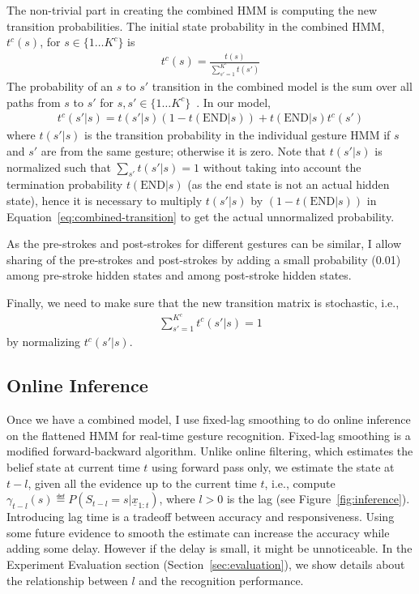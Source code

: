 The non-trivial part in creating the combined HMM is computing the new 
transition probabilities. The initial state probability in the combined
HMM, $t^c(s)$, for $s\in\{1\ldots K^c\}$ is
\begin{align*}
t^c(s) = \frac{t(s)}{\sum_{s'=1}^{K^c} t(s')}
\end{align*}
The probability of an $s$ to $s'$ transition
in the combined model is the sum over all paths from $s$ to
$s'$ for $s, s'\in\{1\ldots K^c\}$~\cite{murphy02}. In our model, 
\begin{align}
t^c(s'|s) = t(s' | s) (1-t(\text{END}|s)) +
t(\text{END}|s)t^c(s')
\label{eq:combined-transition}
\end{align}
where $t(s'|s)$ is the transition probability in the individual gesture HMM if
$s$ and $s'$ are from the same gesture; otherwise it is zero. Note that
$t(s'|s)$ is normalized such that $\sum_{s'}t(s'|s) = 1$ without taking into
account the termination probability $t(\text{END}|s)$ (as the end state is not
an actual hidden state), hence it is necessary to multiply $t(s'|s)$ by $
(1-t(\text{END}|s))$ in Equation~\ref{eq:combined-transition} to get the actual
unnormalized probability.

As the pre-strokes and post-strokes for different gestures can be similar, I
allow sharing of the pre-strokes and post-strokes by adding a small probability
(0.01) among pre-stroke hidden states and among post-stroke hidden states.

Finally, we need to make sure that the new transition matrix is stochastic,
i.e., 
\begin{align*}
\sum_{s' = 1}^{K^c} t^c(s'|s) = 1
\end{align*}
by normalizing $t^c(s'|s)$.

\subsection{Online Inference}
Once we have a combined model, I use fixed-lag smoothing \cite{murphy02} to do
online inference on the flattened HMM for real-time gesture recognition.
Fixed-lag smoothing is a modified forward-backward algorithm. Unlike online
filtering, which estimates the belief state at current time $t$ using forward
pass only, we estimate the state at $t - l$, given all the evidence up to the
current time $t$, i.e., compute $\gamma_{t - l}(s) \eqdef P(S_{t -
l} = s|\underline{x}_{1:t})$, where $l > 0$ is the lag (see
Figure~\ref{fig:inference}).
Introducing lag time is a tradeoff between accuracy and responsiveness. Using some future evidence to
smooth the estimate can increase the accuracy while adding some delay. However
if the delay is small, it might be unnoticeable.
In the Experiment Evaluation section (Section~\ref{sec:evaluation}), we show
details about the relationship between $l$ and the recognition performance.

